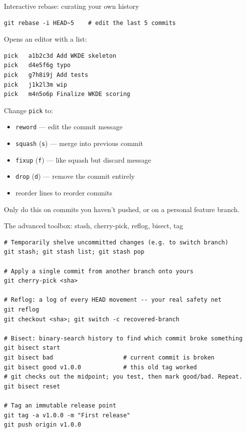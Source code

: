\documentclass[10pt,aspectratio=169]{beamer}
\begin{document}
\begin{frame}[fragile]{Interactive rebase: curating your own history}
\begin{lstlisting}
git rebase -i HEAD~5    # edit the last 5 commits
\end{lstlisting}

  Opens an editor with a list:
\begin{lstlisting}
pick   a1b2c3d Add WKDE skeleton
pick   d4e5f6g typo
pick   g7h8i9j Add tests
pick   j1k2l3m wip
pick   m4n5o6p Finalize WKDE scoring
\end{lstlisting}

  Change \texttt{pick} to:
  \begin{itemize}
    \item \texttt{reword} --- edit the commit message
    \item \texttt{squash} (\texttt{s}) --- merge into previous commit
    \item \texttt{fixup} (\texttt{f}) --- like squash but discard message
    \item \texttt{drop} (\texttt{d}) --- remove the commit entirely
    \item reorder lines to reorder commits
  \end{itemize}

  \vspace{0.3em}
  \alert{Only do this on commits you haven't pushed, or on a personal feature branch.}
\end{frame}

\begin{frame}[fragile]{The advanced toolbox: stash, cherry-pick, reflog, bisect, tag}
\begin{lstlisting}
# Temporarily shelve uncommitted changes (e.g. to switch branch)
git stash; git stash list; git stash pop

# Apply a single commit from another branch onto yours
git cherry-pick <sha>

# Reflog: a log of every HEAD movement -- your real safety net
git reflog
git checkout <sha>; git switch -c recovered-branch

# Bisect: binary-search history to find which commit broke something
git bisect start
git bisect bad                    # current commit is broken
git bisect good v1.0.0            # this old tag worked
# git checks out the midpoint; you test, then mark good/bad. Repeat.
git bisect reset

# Tag an immutable release point
git tag -a v1.0.0 -m "First release"
git push origin v1.0.0
\end{lstlisting}
\end{frame}
\end{document}
